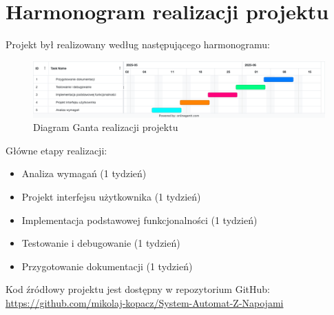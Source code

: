 \section{Harmonogram realizacji projektu}
Projekt był realizowany według następującego harmonogramu:

\begin{figure}[H]
\centering
\includegraphics[width=\textwidth]{figures/gantt_chart.png}
\caption{Diagram Ganta realizacji projektu}
\label{fig:gantt}
\end{figure}

Główne etapy realizacji:
\begin{itemize}
\item Analiza wymagań (1 tydzień)
\item Projekt interfejsu użytkownika (1 tydzień)
\item Implementacja podstawowej funkcjonalności (1 tydzień)
\item Testowanie i debugowanie (1 tydzień)
\item Przygotowanie dokumentacji (1 tydzień)
\end{itemize}



Kod źródłowy projektu jest dostępny w repozytorium GitHub: \url{https://github.com/mikolaj-kopacz/System-Automat-Z-Napojami}